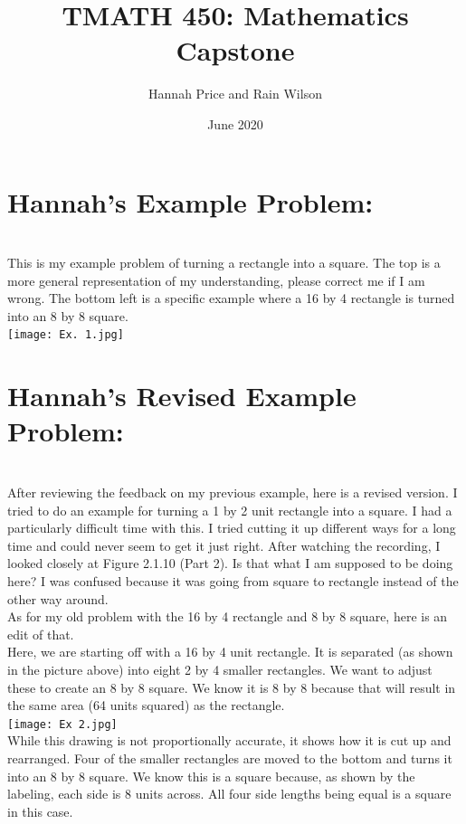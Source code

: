 \documentclass{article}
\title{TMATH 450:  Mathematics Capstone}
\author{Hannah Price and Rain Wilson}
\date{June 2020}
\begin{document}
\maketitle

\section*{Hannah's Example Problem:}\\
This is my example problem of turning a rectangle into a square. The top is a more general representation of my understanding, please correct me if I am wrong. The bottom left is a specific example where a 16 by 4 rectangle is turned into an 8 by 8 square.\\

\texttt{[image: Ex. 1.jpg]}\\

\section*{Hannah's Revised Example Problem:}\\
After reviewing the feedback on my previous example, here is a revised version. I tried to do an example for turning a 1 by 2 unit rectangle into a square. I had a particularly difficult time with this. I tried cutting it up different ways for a long time and could never seem to get it just right. After watching the recording, I looked closely at Figure 2.1.10 (Part 2). Is that what I am supposed to be doing here? I was confused because it was going from square to rectangle instead of the other way around.\\
As for my old problem with the 16 by 4 rectangle and 8 by 8 square, here is an edit of that.\\
Here, we are starting off with a 16 by 4 unit rectangle. It is separated (as shown in the picture above) into eight 2 by 4 smaller rectangles. We want to adjust these to create an 8 by 8 square. We know it is 8 by 8 because that will result in the same area (64 units squared) as the rectangle.\\

\texttt{[image: Ex 2.jpg]}\\

While this drawing is not proportionally accurate, it shows how it is cut up and rearranged. Four of the smaller rectangles are moved to the bottom and turns it into an 8 by 8 square. We know this is a square because, as shown by the labeling, each side is 8 units across. All four side lengths being equal is a square in this case. \\
\end{document}
